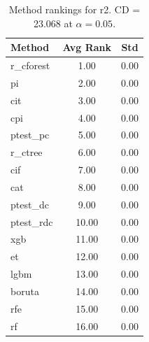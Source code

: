 \begin{table}[h]
\centering
\caption{Method rankings for r2. CD = 23.068 at $\alpha=0.05$.}
\label{tab:ranks_r2}
\begin{tabular}{lcc}
\toprule
Method & Avg Rank & Std \\
\midrule
r_cforest & 1.00 & 0.00 \\
pi & 2.00 & 0.00 \\
cit & 3.00 & 0.00 \\
cpi & 4.00 & 0.00 \\
ptest_pc & 5.00 & 0.00 \\
r_ctree & 6.00 & 0.00 \\
cif & 7.00 & 0.00 \\
cat & 8.00 & 0.00 \\
ptest_dc & 9.00 & 0.00 \\
ptest_rdc & 10.00 & 0.00 \\
xgb & 11.00 & 0.00 \\
et & 12.00 & 0.00 \\
lgbm & 13.00 & 0.00 \\
boruta & 14.00 & 0.00 \\
rfe & 15.00 & 0.00 \\
rf & 16.00 & 0.00 \\
\bottomrule
\end{tabular}
\end{table}